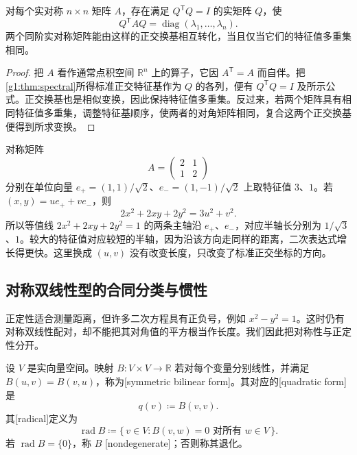 \begin{corollary}
	\label{g1:cor:orthogonal-diagonalization}
	对每个实对称 \(n\times n\) 矩阵 \(A\)，存在满足 \(Q^{\mathsf T}Q=I\) 的实矩阵 \(Q\)，使
	\[
		Q^{\mathsf T}AQ=\operatorname{diag}(\lambda_1,\ldots,\lambda_n).
	\]
	两个同阶实对称矩阵能由这样的正交换基相互转化，当且仅当它们的特征值多重集相同。
\end{corollary}

\begin{proof}
	把 \(A\) 看作通常点积空间 \(\mathbb R^n\) 上的算子，它因 \(A^{\mathsf T}=A\) 而自伴。把\cref{g1:thm:spectral}所得标准正交特征基作为 \(Q\) 的各列，便有 \(Q^{\mathsf T}Q=I\) 及所示公式。正交换基也是相似变换，因此保持特征值多重集。反过来，若两个矩阵具有相同特征值多重集，调整特征基顺序，使两者的对角矩阵相同，复合这两个正交换基便得到所求变换。
\end{proof}

\begin{example}
	\label{g1:exm:ellipse-spectral}
	对称矩阵
	\[
		A=\begin{pmatrix}2&1\\1&2\end{pmatrix}
	\]
	分别在单位向量 \(e_+=(1,1)/\sqrt2\)、\(e_-=(1,-1)/\sqrt2\) 上取特征值 \(3\)、\(1\)。若 \((x,y)=u e_++v e_-\)，则
	\[
		2x^2+2xy+2y^2=3u^2+v^2.
	\]
	所以等值线 \(2x^2+2xy+2y^2=1\) 的两条主轴沿 \(e_+\)、\(e_-\)，对应半轴长分别为 \(1/\sqrt3\)、\(1\)。较大的特征值对应较短的半轴，因为沿该方向走同样的距离，二次表达式增长得更快。这里换成 \((u,v)\) 没有改变长度，只改变了标准正交坐标的方向。
\end{example}

\subsection{对称双线性型的合同分类与惯性}
\label{g1:subsec:0102:03}

正定性适合测量距离，但许多二次方程具有正负号，例如 \(x^2-y^2=1\)。这时仍有对称双线性配对，却不能把其对角值的平方根当作长度。我们因此把对称性与正定性分开。

\begin{definition}
	\label{g1:def:symmetric-form}
	设 \(V\) 是实向量空间。映射 \(B\colon V\times V\rightarrow\mathbb R\) 若对每个变量分别线性，并满足 \(B(u,v)=B(v,u)\)，称为[symmetric bilinear form]。其对应的[quadratic form]是
	\[
		q(v)\coloneqq B(v,v).
	\]
	其[radical]定义为
	\[
		\operatorname{rad}B\coloneqq\{\,v\in V:B(v,w)=0\text{ 对所有 }w\in V\,\}.
	\]
	若 \(\operatorname{rad}B=\{0\}\)，称 \(B\) [nondegenerate]；否则称其退化。
\end{definition}

